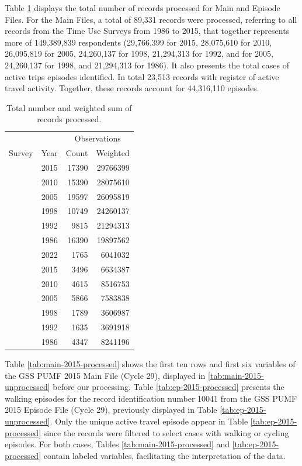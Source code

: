 \documentclass[Royal,times,sageh]{sagej}
\begin{document}
Table \ref{tab:processed-obs} displays the total number of records
processed for Main and Episode Files. For the Main Files, a total of
89,331 records were processed, referring to all records from the Time
Use Surveys from 1986 to 2015, that together represents more of
149,389,839 respondents (29,766,399 for 2015, 28,075,610 for 2010,
26,095,819 for 2005, 24,260,137 for 1998, 21,294,313 for 1992, and for
2005, 24,260,137 for 1998, and 21,294,313 for 1986). It also presents
the total cases of active trips episodes identified. In total 23,513
records with register of active travel activity. Together, these records
account for 44,316,110 episodes.

\begingroup\fontsize{10}{12}\selectfont

\begin{longtable}[t]{lrrr}
\caption{\label{tab:table_df_processed}\label{tab:processed-obs}Total number and weighted sum of records processed.}\\
\toprule
\multicolumn{2}{c}{ } & \multicolumn{2}{c}{Observations} \\
\cmidrule(l{3pt}r{3pt}){3-4}
Survey & Year & Count & Weighted\\
\midrule
 & 2015 & 17390 & 29766399\\
\nopagebreak
 & 2010 & 15390 & 28075610\\
\nopagebreak
 & 2005 & 19597 & 26095819\\
\nopagebreak
 & 1998 & 10749 & 24260137\\
\nopagebreak
 & 1992 & 9815 & 21294313\\
\nopagebreak
\multirow[t]{-6}{*}{\raggedright\arraybackslash Main} & 1986 & 16390 & 19897562\\
\cmidrule{1-4}\pagebreak[0]
 & 2022 & 1765 & 6041032\\
\nopagebreak
 & 2015 & 3496 & 6634387\\
\nopagebreak
 & 2010 & 4615 & 8516753\\
\nopagebreak
 & 2005 & 5866 & 7583838\\
\nopagebreak
 & 1998 & 1789 & 3606987\\
\nopagebreak
 & 1992 & 1635 & 3691918\\
\nopagebreak
\multirow[t]{-7}{*}{\raggedright\arraybackslash Episode} & 1986 & 4347 & 8241196\\
\bottomrule
\end{longtable}
\endgroup{}

Table \ref{tab:main-2015-processed} shows the first ten rows and first
six variables of the GSS PUMF 2015 Main File (Cycle 29), displayed in
\ref{tab:main-2015-unprocessed} before our processing. Table
\ref{tab:ep-2015-processed} presents the walking episodes for the record
identification number 10041 from the GSS PUMF 2015 Episode File (Cycle
29), previously displayed in Table \ref{tab:ep-2015-unprocessed}. Only
the unique active travel episode appear in Table
\ref{tab:ep-2015-processed} since the records were filtered to select
cases with walking or cycling episodes. For both cases, Tables
\ref{tab:main-2015-processed} and \ref{tab:ep-2015-processed} contain
labeled variables, facilitating the interpretation of the data.
\end{document}
